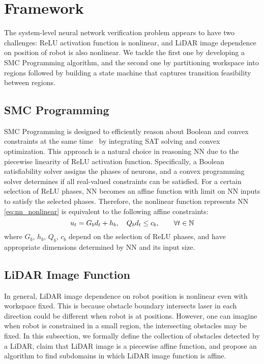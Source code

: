 \section{Framework}

The system-level neural network verification problem appears to have two challenges:
ReLU activation function is nonlinear, and LiDAR image dependence on position of robot is also nonlinear.
We tackle the first one by developing a SMC Programming algorithm,
and the second one by partitioning workspace into regions followed by building a state machine 
that captures transition feasibility between regions.


\subsection{SMC Programming}

SMC Programming is designed to efficiently reason about Boolean and convex constraints 
at the same time~\cite{Shoukry2018SMC} by integrating SAT solving and convex optimization.
This approach is a natural choice in reasoning NN due to the piecewise linearity of ReLU activation function.
Specifically, a Boolean satisfiability solver assigns the phases of neurons, and a convex programming solver 
determines if all real-valued constraints can be satisfied. 
For a certain selection of ReLU phases, NN becomes an affine function with limit on NN inputs to satisfy the selected phases. 
Therefore, the nonlinear function represents NN \eqref{eq:nn_nonlinear} is equivalent to the following affine constraints:
\begin{equation}
    \label{eq:nn_linear}  
    u_t =  G_b d_t + h_b, \quad Q_b d_t \le c_b, \qquad \forall t \in {\mathbb{N}} 
\end{equation}
where $G_b$, $h_b$, $Q_b$, $c_b$ depend on the selection of ReLU phases, and have appropriate dimensions 
determined by NN and its input size.




\subsection{LiDAR Image Function}

In general, LiDAR image dependence on robot position is nonlinear even with workspace fixed.
This is because obstacle boundary intersects laser in each direction could be different when robot is at positions.
However, one can imagine when robot is constrained in a small region, the intersecting obstacles may be fixed.
In this subsection, we formally define the collection of obstacles detected by a LiDAR, 
claim that LiDAR image is a piecewise affine function, 
and propose an algorithm to find subdomains in which LiDAR image function is affine.


